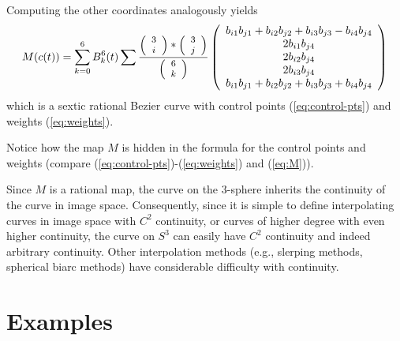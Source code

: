 Computing the other coordinates analogously yields
\[ M(c(t)) = 
   \sum_{k=0}^6 B_k^6(t)
	\sum \frac{\mbox{\footnotesize{$\left( \begin{array}{c} 3 \\ i \end{array} \right)$}} * \mbox{\footnotesize{$\left( \begin{array}{c} 3 \\ j \end{array} \right)$}}}{\mbox{\footnotesize{$\left( \begin{array}{c} 6 \\ k \end{array} \right)$}}}
	\left( \begin{array}{c}
            b_{i1} b_{j1} + b_{i2} b_{j2} + b_{i3} b_{j3} - b_{i4} b_{j4} \\
            2b_{i1} b_{j4} \\
            2b_{i2} b_{j4} \\
            2b_{i3} b_{j4} \\
            b_{i1} b_{j1} + b_{i2} b_{j2} + b_{i3} b_{j3} + b_{i4} b_{j4}
	\end{array} \right) \]
%
which is a sextic rational Bezier curve with 
control points (\ref{eq:control-pts}) and weights (\ref{eq:weights}).
\QED

Notice how the map $M$ is hidden in the formula for the control points 
and weights (compare (\ref{eq:control-pts})-(\ref{eq:weights}) and (\ref{eq:M})).

Since $M$ is a rational map,
the curve on the 3-sphere inherits the continuity of the curve in image space.
Consequently, since it is simple to define interpolating curves
in image space with $C^2$ continuity, or curves of higher degree with
even higher continuity, 
the curve on $S^3$ can easily have $C^2$ continuity
and indeed arbitrary continuity.
Other interpolation methods (e.g., slerping methods, spherical biarc methods)
have considerable difficulty with continuity.

\section{Examples}
\label{sec:eg}

